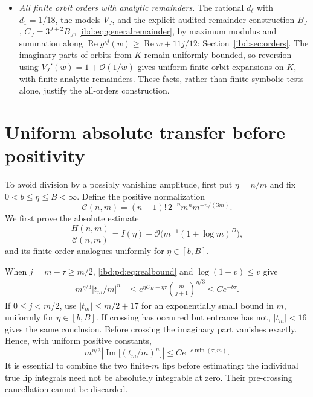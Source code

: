 \documentclass[11pt,letterpaper]{article}
\theoremstyle{remark}\newtheorem{remark}[theorem]{Remark}
\newcommand{\Oh}{\mathcal O}
\DeclareMathOperator{\Rea}{Re}
\DeclareMathOperator{\Ima}{Im}
\begin{document}
\begin{itemize}
\begin{equation}\label{ibd:pd:eq:seed}
 \Rea\Psi(-s+i0)\leq3-1/s\quad(0<s\leq1/2),\qquad
 1.64<I(1)<2.93.
\end{equation}
Only the strict lower bound is needed for positivity at all parameters.
\item \emph{All finite orbit orders with analytic remainders.} The rational $d_\ell$ with $d_1=1/18$, the models $V_J$, and the explicit audited remainder construction $B_J$, $C_J=3^{J+2}B_J$, \eqref{ibd:eq:generalremainder}, by maximum modulus and summation along $\Rea g^{\circ j}(w)\ge\Rea w+11j/12$: Section~\ref{ibd:sec:orders}. The imaginary parts of orbits from $K$ remain uniformly bounded, so reversion using $V_J'(w)=1+\Oh(1/w)$ gives uniform finite orbit expansions on $K$, with finite analytic remainders. These facts, rather than finite symbolic tests alone, justify the all-orders construction.
\end{itemize}

\section{Uniform absolute transfer before positivity}\label{ibd:pd:sec:transfer}
To avoid division by a possibly vanishing amplitude, first put $\eta=n/m$ and fix $0<b\leq\eta\leq B<\infty$. Define the positive normalization
\begin{equation}\label{ibd:pd:eq:Cnm}
 \mathcal C(n,m)=(n-1)!\,2^{-n}m^n m^{-n/(3m)}.
\end{equation}
We first prove the absolute estimate
\begin{equation}\label{ibd:pd:eq:absolute}
 \frac{H(n,m)}{\mathcal C(n,m)}
 =I(\eta)+\Oh\bigl(m^{-1}(1+\log m)^D\bigr),
\end{equation}
and its finite-order analogues uniformly for $\eta\in[b,B]$.

When $j=m-\tau\geq m/2$, \eqref{ibd:pd:eq:realbound} and $\log(1+v)\leq v$ give
\begin{align}\label{ibd:pd:eq:delay}
 m^{\eta/3}|t_m/m|^n
 &\leq e^{\eta C_K-\eta\tau}
 \left(\frac m{j+1}\right)^{\eta/3}
 \leq C e^{-b\tau}.
\end{align}
If $0\leq j<m/2$, use $|t_m|\leq m/2+17$ for an exponentially small bound in $m$, uniformly for $\eta\in[b,B]$. If crossing has occurred but entrance has not, $|t_m|<16$ gives the same conclusion. Before crossing the imaginary part vanishes exactly. Hence, with uniform positive constants,
\begin{equation}\label{ibd:pd:eq:jumpbound}
 m^{\eta/3}\left|\Ima\bigl[(t_m/m)^n\bigr]\right|
 \leq C e^{-c\min(\tau,m)}.
\end{equation}
It is essential to combine the two finite-$m$ lips before estimating: the individual true lip integrals need not be absolutely integrable at zero. Their pre-crossing cancellation cannot be discarded.
\end{document}
